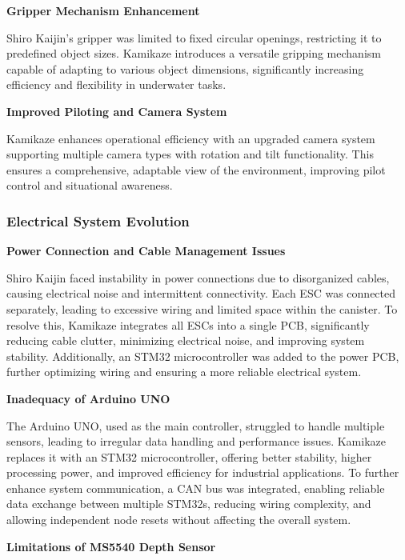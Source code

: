 \vspace{0.2cm}
\textbf{Gripper Mechanism Enhancement}

Shiro Kaijin’s gripper was limited to fixed circular openings, restricting it to predefined object sizes. Kamikaze introduces a versatile gripping mechanism capable of adapting to various object dimensions, significantly increasing efficiency and flexibility in underwater tasks.

\vspace{0.2cm}
\textbf{Improved Piloting and Camera System}

Kamikaze enhances operational efficiency with an upgraded camera system supporting multiple camera types with rotation and tilt functionality. This ensures a comprehensive, adaptable view of the environment, improving pilot control and situational awareness.

\subsubsection{Electrical System Evolution}

\textbf{Power Connection and Cable Management Issues}

Shiro Kaijin faced instability in power connections due to disorganized cables, causing electrical noise and intermittent connectivity. Each ESC was connected separately, leading to excessive wiring and limited space within the canister. To resolve this, Kamikaze integrates all ESCs into a single PCB, significantly reducing cable clutter, minimizing electrical noise, and improving system stability. Additionally, an STM32 microcontroller was added to the power PCB, further optimizing wiring and ensuring a more reliable electrical system.

\vspace{0.2cm}
\textbf{Inadequacy of Arduino UNO}

The Arduino UNO, used as the main controller, struggled to handle multiple sensors, leading to irregular data handling and performance issues. Kamikaze replaces it with an STM32 microcontroller, offering better stability, higher processing power, and improved efficiency for industrial applications. To further enhance system communication, a CAN bus was integrated, enabling reliable data exchange between multiple STM32s, reducing wiring complexity, and allowing independent node resets without affecting the overall system.

\vspace{0.2cm}
\textbf{Limitations of MS5540 Depth Sensor}

